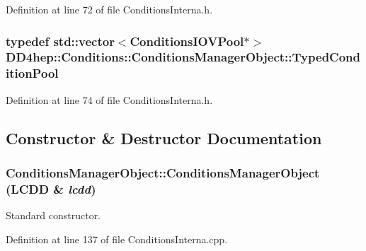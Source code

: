 Definition at line 72 of file ConditionsInterna.h.\hypertarget{class_d_d4hep_1_1_conditions_1_1_conditions_manager_object_a1617c134372fbb79d06990707f19bb0c}{
\subsubsection[{TypedConditionPool}]{\setlength{\rightskip}{0pt plus 5cm}typedef std::vector$<${\bf ConditionsIOVPool}$\ast$$>$ {\bf DD4hep::Conditions::ConditionsManagerObject::TypedConditionPool}}}
\label{class_d_d4hep_1_1_conditions_1_1_conditions_manager_object_a1617c134372fbb79d06990707f19bb0c}


Definition at line 74 of file ConditionsInterna.h.

\subsection{Constructor \& Destructor Documentation}
\hypertarget{class_d_d4hep_1_1_conditions_1_1_conditions_manager_object_adff4e6fe39f5057945ff8ac0634aad2e}{
\subsubsection[{ConditionsManagerObject}]{\setlength{\rightskip}{0pt plus 5cm}ConditionsManagerObject::ConditionsManagerObject (LCDD \& {\em lcdd})}}
\label{class_d_d4hep_1_1_conditions_1_1_conditions_manager_object_adff4e6fe39f5057945ff8ac0634aad2e}


Standard constructor. 

Definition at line 137 of file ConditionsInterna.cpp.

